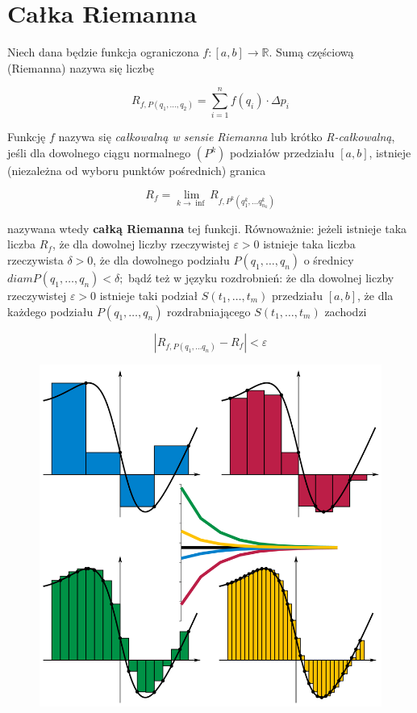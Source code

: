 \documentclass[a4paper,12pt,fleqn]{article}
\theoremstyle{definition}
\begin{document}

\section*{Całka Riemanna}

Niech dana będzie funkcja ograniczona $f \colon [a,b] \rightarrow \mathbb{R}$. Sumą częściową (Riemanna) nazywa się liczbę

\begin{equation}
R_{f,P(q_{1}, \dots , q_{2})} = \sum_{i=1}^{n} f(q_{i})\cdot \Delta p_{i}
\end{equation}

\noindent
Funkcję $f$ nazywa się \emph{całkowalną w sensie Riemanna} lub krótko \emph{R-całkowalną}, jeśli dla dowolnego ciągu normalnego $(P^{k})$ podziałów przedziału $[a,b]$, istnieje (niezależna od wyboru punktów pośrednich) granica

$$
R_{f} = \lim_{k \rightarrow \inf} R_{f, P^{k}(q_{1}^{k}, \dots q_{n_{k}}^{k})}
$$

\noindent
nazywana wtedy \textbf{całką Riemanna} tej funkcji. Równoważnie: jeżeli istnieje taka liczba $R_{f}$, że dla dowolnej liczby rzeczywistej $\varepsilon > 0$ istnieje taka liczba rzeczywista $\delta > 0$, że dla dowolnego podziału $P(q_{1}, \dots , q_{n})$ o średnicy $diam P(q_{1}, \dots , q_{n}) < \delta;$ bądź też w języku rozdrobnień: że dla dowolnej liczby rzeczywistej $\varepsilon > 0$ istnieje taki podział $S(t_{1}, \dots , t_{m})$ przedziału $\left[ a,b \right]$, że dla każdego podziału $P(q_{1}, \dots , q_{n})$ rozdrabniającego $S(t_{1}, \dots , t_{m})$ zachodzi

$$
\left| R_{f, P(q_{1}, \dots q_{n})} - R_{f} \right| < \varepsilon
$$

\begin{figure}[!htb]
\centerline{\includegraphics[scale=1.5]{wykresy.png}}
\label{fig:ukladPrzekaznikowy}
\end{figure}
\end{document}
